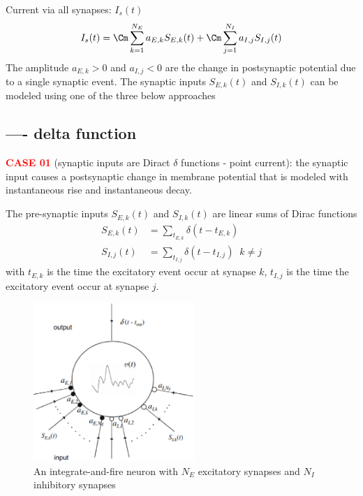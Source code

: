 Current via all  synapses: $I_s(t)$
\begin{equation}
I_s(t) = \Cm \sum_{k=1}^{N_E} a_{E,k} S_{E,k}(t) + \Cm
\sum_{j=1}^{N_I}a_{I,j}S_{I,j}(t)
\end{equation}  
The amplitude $a_{E,k}>0$ and $a_{I,j}<0$ are the change in postsynaptic
potential due to a single synaptic event. 
The synaptic inputs $S_{E,k}(t)$ and
$S_{I,k}(t)$  can be modeled using one of the three below approaches

\subsection{ ---- delta function}
\textcolor{red}{\bf CASE 01} (synaptic inputs are Diract $\delta$ functions -
point current): the synaptic input causes a postsynaptic change in membrane
potential that is modeled with instantaneous rise and instantaneous decay. 

The pre-synaptic inputs $S_{E,k}(t)$ and $S_{I,k}(t)$ are linear sums of Dirac
functions 
\begin{equation}
\begin{split}
S_{E,k}(t) &= \sum_{t_{E,k}} \delta(t-t_{E,k}) \\
S_{I,j}(t) &= \sum_{t_{I,j}} \delta(t-t_{I,j}) \;\; k\ne j 
\end{split}
\end{equation} 
with $t_{E,k}$ is the time the excitatory event occur at synapse $k$, 
$t_{I,j}$ is the time the excitatory event occur at synapse $j$.


\begin{figure}[htbp]
\centerline{\includegraphics[height=6cm]{./images/integrate-and-fire_neuron_synaptic-input.eps}}
\caption{An
integrate-and-fire neuron
with $N_E$ excitatory
synapses and $N_I$
inhibitory synapses}\label{fig:integrate-and-fire_neuron_synaptic-input}
\end{figure} 


